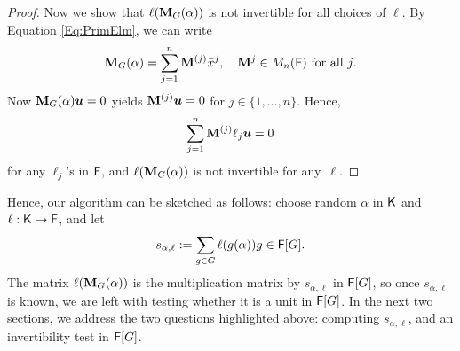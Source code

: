 \begin{proof}
  Now we show that $\ell(\mat M_G(\alpha))$ is not invertible for all
  choices of $\ell$. By Equation \eqref{Eq:PrimElm}, we can write
  $$\mat M_G(\alpha) = \sum_{j = 1}^n \mat M^{(j)} \bar x^j, \quad 
  \mat M^{j} \in M_{n}(\F) \text{~for all $j$}.$$ Now
  $\mat M_G(\alpha) \boldsymbol{u} =0$ yields
  $\mat M^{(j)}\boldsymbol{u} = 0$ for
  $j \in \lbrace 1, \ldots , n \rbrace$. Hence,
$$\sum_{j = 1}^n \mat M^{(j)} \ell_j \boldsymbol{u} = 0$$ for any 
$\ell_j$'s in ${\mathsf{F}}$, and $\ell(\mat M_G(\alpha))$ is not invertible for any~$\ell$.
\end{proof} 
Hence, our algorithm can be sketched as follows: choose random
$\alpha$ in ${\mathsf{K}}$ and $\ell: {\mathsf{K}}\to{\mathsf{F}}$, and let
$$s_{\alpha,\ell}:=\sum_{g \in G} \ell(g(\alpha))g \in {\mathsf{F}}[G].$$ The
matrix $\ell(\mat M_G (\alpha))$ is the multiplication matrix by
$s_{\alpha,\ell}$ in ${\mathsf{F}}[G]$, so once $s_{\alpha,\ell}$ is known, we
are left with testing whether it is a unit in ${\mathsf{F}}[G]$.
In the next two sections, we address the two questions highlighted above:
computing $s_{\alpha,\ell}$, and an invertibility test in ${\mathsf{F}}[G]$.


